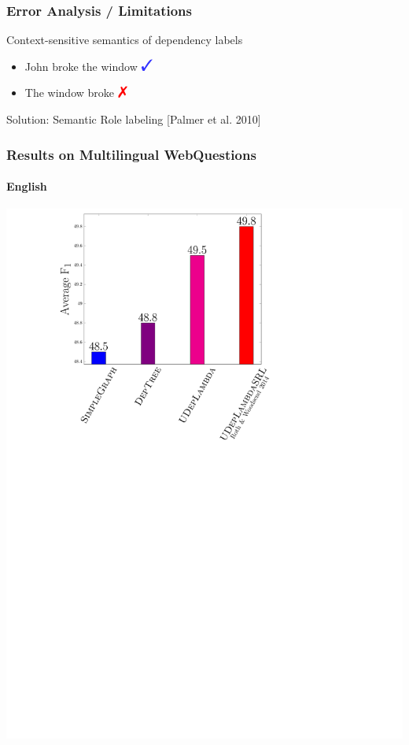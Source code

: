 \documentclass[mathserif,12pt]{beamer}
\newcommand{\cmark}{\ding{51}}%
\newcommand{\xmark}{\ding{55}}%
\newcommand{\hlight}[1]{{\color{blue!80} #1}}
\begin{document}
\begin{frame}
\frametitle{Error Analysis / Limitations}
\large
Context-sensitive semantics of dependency labels
\vspace{1em}
\begin{itemize}
\item John broke the window $\Large \textbf{\hlight{\cmark}}$
\vspace{1em}
\item The {\color{red} window} broke $\Large \textbf{\color{red} {\xmark}}$
\end{itemize}

\vspace{2em}
\hlight{Solution:} Semantic Role labeling [\small Palmer et al. 2010] 
\end{frame}

\begin{frame}
\frametitle{Results on Multilingual WebQuestions}
\framesubtitle{English}
\centering
\large
\vspace{0.4em}
\includegraphics[trim=9em 0em 22em 1em,clip=true,scale=0.45]{figures/deplambda_results_plot_ud}
\end{frame}
\end{document}
